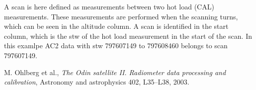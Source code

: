 \documentclass[12pt]{article}
\begin{document}
A scan is here defined as measurements between two hot load (CAL)
measurements. 
These measurements are performed when the scanning turns,
which can be seen in the altitude column.
A scan is identified in the start column, which is the stw
of the hot load measurement in the start of the scan. 
In this examlpe AC2 data with stw 797607149 to 797608460
belongs to scan 797607149. 
\clearpage
\newpage



\clearpage
\newpage

\begin{thebibliography}{1}

 M. Ohlberg et al., {\em The Odin satellite
II. Radiometer data processing and calibration},
Astronomy and astrophysics 402, L35--L38, 2003.

\end{thebibliography}
\end{document}
